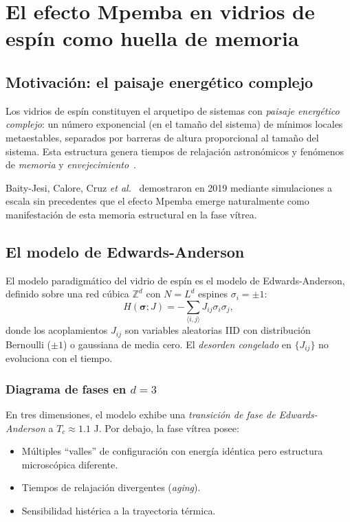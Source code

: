 \chapter{El efecto Mpemba en vidrios de espín como huella de memoria}
\label{ch:spin_glass}

\section{Motivación: el paisaje energético complejo}

Los vidrios de espín constituyen el arquetipo de sistemas con \emph{paisaje 
energético complejo}: un número exponencial (en el tamaño del sistema) de 
mínimos locales metaestables, separados por barreras de altura proporcional al 
tamaño del sistema. Esta estructura genera tiempos de relajación astronómicos 
y fenómenos de \emph{memoria} y \emph{envejecimiento}~\cite{mezard1987}.

Baity-Jesi, Calore, Cruz \emph{et al.}~\cite{baityjesi2019} demostraron en 2019 
mediante simulaciones a escala sin precedentes que el efecto Mpemba emerge 
naturalmente como manifestación de esta memoria estructural en la fase vítrea.

\section{El modelo de Edwards-Anderson}

El modelo paradigmático del vidrio de espín es el modelo de Edwards-Anderson, 
definido sobre una red cúbica $\mathbb{Z}^d$ con $N = L^{d}$ espines $\sigma_{i} = \pm 1$:
\begin{equation}
    H(\bm{\sigma}; J) = -\sum_{\langle i,j \rangle} J_{ij} \sigma_{i} \sigma_{j},
    \label{eq:edwards_anderson}
\end{equation}
%
donde los acoplamientos $J_{ij}$ son variables aleatorias IID con distribución 
Bernoulli ($\pm 1$) o gaussiana de media cero. El \emph{desorden congelado} en 
$\{J_{ij}\}$ no evoluciona con el tiempo.

\subsection{Diagrama de fases en $d = 3$}

En tres dimensiones, el modelo exhibe una \emph{transición de fase de Edwards-Anderson} 
a $T_{c} \approx 1.1$ J. Por debajo, la fase vítrea posee:
\begin{itemize}
\item Múltiples ``valles'' de configuración con energía idéntica pero estructura 
microscópica diferente.
\item Tiempos de relajación divergentes (\emph{aging}).
\item Sensibilidad histérica a la trayectoria térmica.
\end{itemize}

